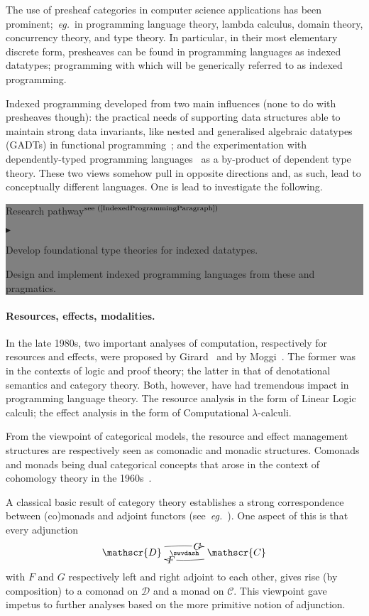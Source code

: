 \documentclass[11pt,twocolumn]{article}
\newenvironment{btritemize}
  {\begin{list}{\btr}
  {\setlength{\topsep}{2pt}
   \setlength{\partopsep}{2pt}
   \setlength{\itemsep}{2.5pt}
   \setlength{\parsep}{2.5pt}
   \setlength{\leftmargin}{1em}
   \setlength{\labelwidth}{.5em}}}
  {\end{list}}
\newcommand{\mytextsf}[1]{\textsf{\small #1}}
\newcommand{\eg}{\emph{eg.}}
\newcommand{\btr}{$\blacktriangleright$}
\newcommand{\reqpsize}{8.113395cm}%
\newcommand{\rep}[2]{\begin{center}\colorbox{grey}{\begin{minipage}{\reqpsize}
  \mytextsf{Research pathway}\hfill$^{\mbox{\scriptsize see #1 }}$\\[-5.5mm]
  \begin{btritemize}
  \item #2
  \end{btritemize}
\end{minipage}}\end{center}}
\newcommand{\cat}[1]{\mathscr{#1}}
\begin{document}
The use of presheaf categories in computer science applications has been
prominent;~\eg~in 
programming language theory, %
lambda calculus, %
domain theory, %
concurrency theory, %
and type theory. %
In particular, in their most elementary discrete form, presheaves can be
found in programming languages as indexed datatypes; programming with
which will be generically referred to as indexed programming.  

Indexed programming developed from two main influences (none to do with
presheaves though): the practical needs of supporting data structures able to
maintain strong data invariants, like nested %
and generalised algebraic %
datatypes (GADTs) in functional programming~\cite{Omega,Haskell}; and the
experimentation with dependently-typed programming
languages~\cite{Cayenne,Epigram} as a by-product of dependent type theory.
These two views somehow pull in opposite directions and, as such, lead to
conceptually different languages.  One is lead to investigate the following.
\rep{(\ref{IndexedProgrammingParagraph})} 
  {Develop foundational type theories for indexed datatypes.  
    
   Design and %
   implement indexed programming languages from these and
   pragmatics.}

\paragraph{Resources, effects, modalities.}
\label{ResourcesEffectsModalitiesParagraph}

In the late 1980s, two important analyses of computation, respectively for
resources and effects, were proposed by Girard~\cite{GirardLinearLogic} and by
Moggi~\cite{MoggiLambdaC}.  The former was in the contexts of logic and proof
theory; the latter in that of denotational semantics and category theory.
Both, however, have had tremendous impact in programming language theory.  The
resource analysis in the form of Linear Logic calculi; the effect analysis
in the form of Computational \mbox{$\lambda$-calculi}.

From the viewpoint of categorical models, the resource and effect management
structures are respectively seen as comonadic and monadic structures.
Comonads and monads being dual categorical concepts that arose in the context
of cohomology theory in the 1960s~\cite{BeckThesis}.

A classical basic result of category theory establishes a strong
correspondence between (co)monads and adjoint functors
(see~\eg~\cite{MacLane}).  One aspect of this is that every adjunction
  \begin{equation}\label{ResourceEffectAdjunction}
  \xymatrix@C=40pt{
    \cat D \ar@/^.75em/[r]|(.625){\mbox{$\,G\,$}}\ar@{}[r]|-\swvdash&
    \ar@/^.75em/[l]|(.625){\mbox{$\,F\,$}} \cat C }
\end{equation}
with $F$ and $G$ respectively left and right adjoint to each other, gives
rise (by composition) to a comonad on $\cat D$ and a monad on $\cat C$.  This
viewpoint gave impetus to further analyses based on the more primitive notion
of adjunction.  
\end{document}

